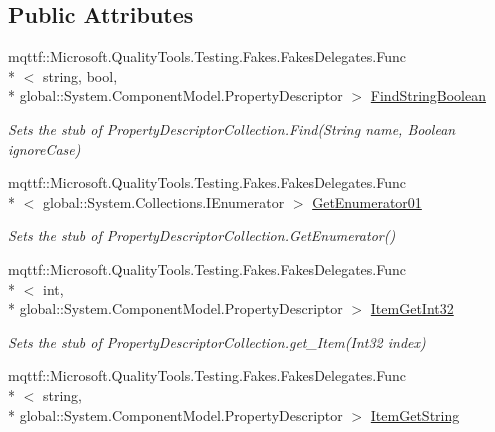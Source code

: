 \subsection*{Public Attributes}
\begin{DoxyCompactItemize}
\item 
mqttf\-::\-Microsoft.\-Quality\-Tools.\-Testing.\-Fakes.\-Fakes\-Delegates.\-Func\\*
$<$ string, bool, \\*
global\-::\-System.\-Component\-Model.\-Property\-Descriptor $>$ \hyperlink{class_system_1_1_component_model_1_1_fakes_1_1_stub_property_descriptor_collection_a946ac6ef84a9f0454abbdf35a1df4185}{Find\-String\-Boolean}
\begin{DoxyCompactList}\small\item\em Sets the stub of Property\-Descriptor\-Collection.\-Find(\-String name, Boolean ignore\-Case)\end{DoxyCompactList}\item 
mqttf\-::\-Microsoft.\-Quality\-Tools.\-Testing.\-Fakes.\-Fakes\-Delegates.\-Func\\*
$<$ global\-::\-System.\-Collections.\-I\-Enumerator $>$ \hyperlink{class_system_1_1_component_model_1_1_fakes_1_1_stub_property_descriptor_collection_a4f7bf8314a7bd1fefdd659bb02db1954}{Get\-Enumerator01}
\begin{DoxyCompactList}\small\item\em Sets the stub of Property\-Descriptor\-Collection.\-Get\-Enumerator()\end{DoxyCompactList}\item 
mqttf\-::\-Microsoft.\-Quality\-Tools.\-Testing.\-Fakes.\-Fakes\-Delegates.\-Func\\*
$<$ int, \\*
global\-::\-System.\-Component\-Model.\-Property\-Descriptor $>$ \hyperlink{class_system_1_1_component_model_1_1_fakes_1_1_stub_property_descriptor_collection_a7fce199636d88712bef82ae7a1684d21}{Item\-Get\-Int32}
\begin{DoxyCompactList}\small\item\em Sets the stub of Property\-Descriptor\-Collection.\-get\-\_\-\-Item(\-Int32 index)\end{DoxyCompactList}\item 
mqttf\-::\-Microsoft.\-Quality\-Tools.\-Testing.\-Fakes.\-Fakes\-Delegates.\-Func\\*
$<$ string, \\*
global\-::\-System.\-Component\-Model.\-Property\-Descriptor $>$ \hyperlink{class_system_1_1_component_model_1_1_fakes_1_1_stub_property_descriptor_collection_a6d6d4e2d3b94b467910f5b648c1093e5}{Item\-Get\-String}

\end{DoxyCompactItemize}
